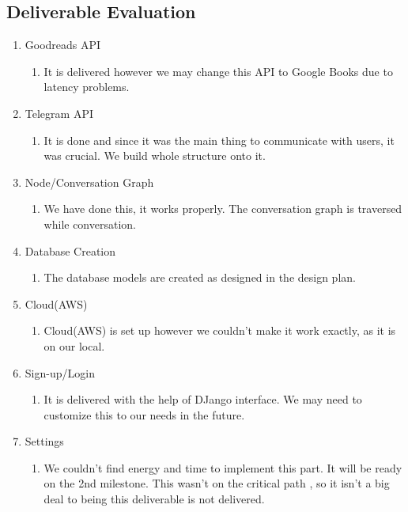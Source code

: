 \documentclass[a4paper]{article}
\begin{document}
\subsection{Deliverable Evaluation}
\begin{enumerate}
\item Goodreads API
\begin{enumerate}
  \item It is delivered however we may change this API to Google Books due to latency problems.
   \end{enumerate}
   \item  Telegram API
   \begin{enumerate}
    \item It is done and since it was the main thing to communicate with users, it was crucial. We build whole structure onto it.
     \end{enumerate}
   \item  Node/Conversation Graph
   \begin{enumerate}
    \item We have done this, it works properly. The conversation graph is traversed while conversation.
   \end{enumerate}
   \item Database Creation  
   \begin{enumerate}
   \item The database models are created as designed in the design plan.
  \end{enumerate}
  \item   Cloud(AWS)
  \begin{enumerate}
 \item Cloud(AWS) is set up however we couldn't make it work exactly, as it is on our local.
  \end{enumerate}
  \item   Sign-up/Login
  \begin{enumerate}
  \item It is delivered with the help of DJango interface. We may need to customize this to our needs in the future. 
  \end{enumerate}
  \item   Settings
  \begin{enumerate}
 \item  We couldn't find energy and time to implement this part. It will be ready on the 2nd milestone. This wasn't on the critical path , so it isn't a big deal to being this deliverable is not delivered.
  \end{enumerate}

\end{enumerate}
\end{document}
